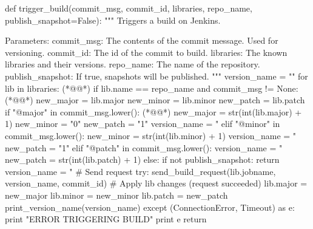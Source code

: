 \begin{pythoncode}[caption=Part of the git hook responsible for setting library version names and triggering Jenkins,label=lst:git_hook_trigger_build]
def trigger_build(commit_msg, commit_id, libraries, repo_name, publish_snapshot=False):
    """
    Triggers a build on Jenkins.

    Parameters:
        commit_msg:       The contents of the commit message. Used for versioning.
        commit_id:        The id of the commit to build.
        libraries:        The known libraries and their versions.
        repo_name:        The name of the repository.
        publish_snapshot: If true, snapshots will be published.
    """
    version_name = ""
    for lib in libraries: (*@\label{githook:13}@*)
        if lib.name == repo_name and commit_msg != None: (*@\label{githook:14}@*)
            new_major = lib.major
            new_minor = lib.minor
            new_patch = lib.patch
            if "@major" in commit_msg.lower(): (*@\label{githook:18}@*)
                new_major = str(int(lib.major) + 1)
                new_minor = "0"
                new_patch = "1"
                version_name = "%
            elif "@minor" in commit_msg.lower():
                new_minor = str(int(lib.minor) + 1)
                version_name = "%
                new_patch = "1"
            elif "@patch" in commit_msg.lower():
                version_name = "%
                new_patch = str(int(lib.patch) + 1)
            else:
                if not publish_snapshot:
                    return
                version_name = "%
            # Send request
            try:
                send_build_request(lib.jobname, version_name, commit_id)
                # Apply lib changes (request succeeded)
                lib.major = new_major
                lib.minor = new_minor
                lib.patch = new_patch
                print_version_name(version_name)
            except (ConnectionError, Timeout) as e:
                print "ERROR TRIGGERING BUILD"
                print e
            return
\end{pythoncode}

